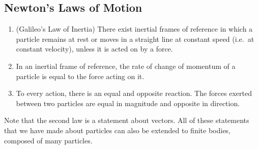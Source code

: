 \subsection{Newton's Laws of Motion}
\begin{enumerate}
	\item (Galileo's Law of Inertia) There exist inertial frames of reference in which a particle remains at rest or moves in a straight line at constant speed (i.e.\ at constant velocity), unless it is acted on by a force.
	\item In an inertial frame of reference, the rate of change of momentum of a particle is equal to the force acting on it.
	\item To every action, there is an equal and opposite reaction.
	      The forces exerted between two particles are equal in magnitude and opposite in direction.
\end{enumerate}
Note that the second law is a statement about vectors.
All of these statements that we have made about particles can also be extended to finite bodies, composed of many particles.
